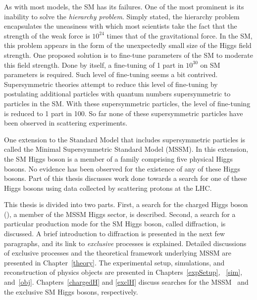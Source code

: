 \par As with most models, the SM has its failures. One of the most prominent  
is its inability to solve the {\it hierarchy problem}. 
Simply stated, the hierarchy problem encapsulates the uneasiness with which most 
scientists take the fact that the strength of the weak force is 
$10^{24}$ times that of the gravitational force. 
%
In the SM, this problem appears in the form of the unexpectedly small size of the Higgs field strength.
One proposed solution is to fine-tune parameters of the SM to moderate this field strength. 
Done by itself, a fine-tuning of 1 part in $10^{30}$ on SM parameters is required. 
Such level of fine-tuning seems a bit contrived. 
Supersymmetric theories attempt to reduce this level of fine-tuning by postulating additional particles with quantum 
numbers supersymmetric to particles in the SM. With these supersymmetric particles, 
the level of fine-tuning is reduced to 1 part in 100. So far none of these supersymmetric particles have 
been observed in scattering experiments.  

\par One extension to the Standard Model that includes supersymmetric particles is called the Minimal 	
Supersymmetric Standard Model (MSSM). In this extension, the SM Higgs boson is a member of a 
family comprising five physical Higgs bosons. No evidence has been observed for the existence of 
any of these Higgs bosons. Part of this thesis discusses work done towards a search for one of these 
Higgs bosons using data collected by scattering protons at the LHC.  

\par This thesis is divided into two parts. First, a search for the charged Higgs boson (\Hpm), 
a member of the MSSM Higgs sector, is described. Second, a search for a particular 
production mode for the SM Higgs boson, called diffraction, is discussed.  
A brief introduction to diffraction is presented in the next few paragraphs, and its link to 
{\it exclusive} processes is explained. Detailed discussions of exclusive processes and the 
theoretical framework underlying MSSM are presented in Chapter~\ref{theory}. The experimental setup, 
simulations, and reconstruction of physics objects are presented in 
Chapters~\ref{expSetup}, ~\ref{sim}, and~\ref{obj}. Chapters~\ref{chargedH} and 
\ref{exclH} discuss searches for the MSSM \Hpm\ and the exclusive SM Higgs bosons, respectively. 

